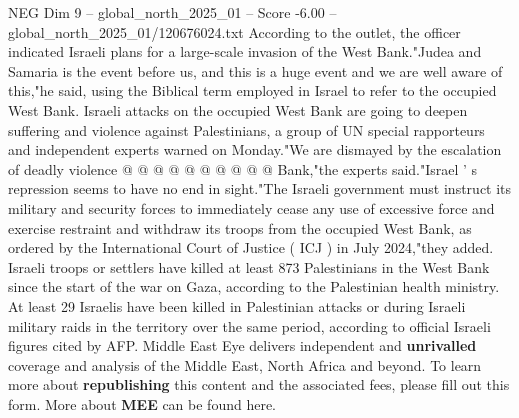 \begin{textsample}{NEG Dim 9 – global\_north\_2025\_01 – Score -6.00 – global\_north\_2025\_01/120676024.txt}
According to the outlet, the officer indicated Israeli plans for a large-scale invasion of the West Bank."Judea and Samaria is the event before us, and this is a huge event and we are well aware of this,"he said, using the Biblical term employed in Israel to refer to the occupied West Bank.
Israeli attacks on the occupied West Bank are going to deepen suffering and violence against Palestinians, a group of UN special rapporteurs and independent experts warned on Monday."We are dismayed by the escalation of deadly violence @ @ @ @ @ @ @ @ @ @ Bank,"the experts said."Israel ' s repression seems to have no end in sight."The Israeli government must instruct its military and security forces to immediately cease any use of excessive force and exercise restraint and withdraw its troops from the occupied West Bank, as ordered by the International Court of Justice ( ICJ ) in July 2024,"they added.
Israeli troops or settlers have killed at least 873 Palestinians in the West Bank since the start of the war on Gaza, according to the Palestinian health ministry.
At least 29 Israelis have been killed in Palestinian attacks or during Israeli military raids in the territory over the same period, according to official Israeli figures cited by AFP.
Middle East Eye delivers independent and \textbf{unrivalled} coverage and analysis of the Middle East, North Africa and beyond.
To learn more about \textbf{republishing} this content and the associated fees, please fill out this form.
More about \textbf{MEE} can be found here.

\end{textsample}
